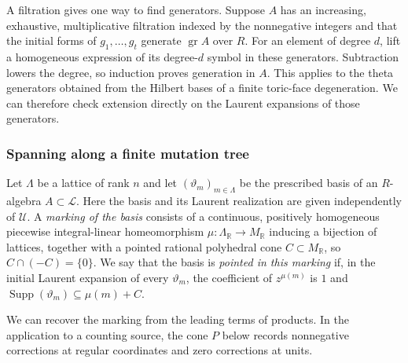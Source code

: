 \documentclass[11pt,reqno]{amsart}
\numberwithin{equation}{section}
\theoremstyle{definition}
\theoremstyle{remark}
\DeclareMathOperator{\Supp}{Supp}
\begin{document}
A filtration gives one way to find generators. Suppose \(A\) has an
increasing, exhaustive, multiplicative filtration indexed by the
nonnegative integers and that the initial forms of \(g_1,\ldots,g_t\)
generate \(\operatorname{gr} A\) over \(R\). For an element of degree \(d\),
lift a homogeneous expression of its degree-\(d\) symbol in these
generators. Subtraction lowers the degree, so induction proves generation
in \(A\). This applies to the theta generators obtained from the Hilbert
bases of a finite toric-face degeneration. We can therefore check
extension directly on the Laurent expansions of those generators.

\subsubsection{Spanning along a finite mutation tree}

Let \(\Lambda\) be a lattice of rank \(n\) and let
\((\vartheta_m)_{m\in\Lambda}\) be the prescribed basis of an \(R\)-algebra
\(A\subset \mathcal L\). Here the basis and its Laurent realization are given
independently of \(\mathcal U\). A \emph{marking of the basis} consists of a continuous,
positively homogeneous piecewise integral-linear homeomorphism
\(\mu:\Lambda_{\mathbb R}\longrightarrow M_{\mathbb R}\) inducing a
bijection of lattices, together with a pointed rational polyhedral cone
\(C\subset M_{\mathbb R}\), so \(C\cap(-C)=\{0\}\). We say that the basis is \emph{pointed in
this marking} if, in the initial Laurent expansion of every \(\vartheta_m\),
the coefficient of \(z^{\mu(m)}\) is \(1\) and
\(\Supp(\vartheta_m)\subseteq\mu(m)+C\).

We can recover the marking from the leading terms of products.
In the application to a counting source, the cone \(P\) below records
nonnegative corrections at regular coordinates and zero corrections
at units.
\end{document}
